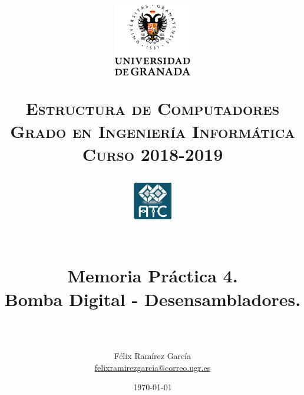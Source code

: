 
\usepackage{url}


\title{	
	\normalfont \normalsize
	\begin{figure}[htb]
		\centering
		\includegraphics[width=0.3\textwidth]{./imagenes/1}
	\end{figure}
	\textsc{\textbf{Estructura de Computadores} \\ Grado en Ingeniería Informática \\ 
	Curso 2018-2019} \\ [25pt] %
	\begin{figure}[htb]
		\centering
		\includegraphics[width=0.15\textwidth]{./imagenes/2}
	\end{figure}
	\horrule{0.5pt} \\[0.4cm] %
	\huge Memoria Práctica 4. \\
	\huge Bomba Digital - Desensambladores.
	\\ %
	\horrule{2pt} \\[0.5cm] %
}
\author{Félix Ramírez García  \\
\href{mailto:felixramirezgarcia@correo.ugr.es}{felixramirezgarcia@correo.ugr.es}} %
\date{\normalsize\today} %



	
	\maketitle %
	
	\newpage %
	
